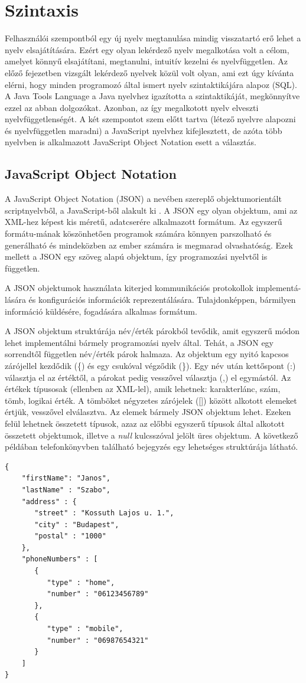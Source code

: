 \documentclass[a4paper,12pt]{report}
\begin{document}
\section{Szintaxis}
Felhasználói szempontból egy új nyelv megtanulása mindig visszatartó erő lehet a nyelv elsajátítására. Ezért egy olyan lekérdező nyelv megalkotása volt a célom, amelyet könnyű elsajátítani, megtanulni, intuitív kezelni és nyelvfüggetlen. Az előző fejezetben vizsgált lekérdező nyelvek közül volt olyan, ami ezt úgy kívánta elérni, hogy minden programozó által ismert nyelv szintaktikájára alapoz (SQL). A Java Tools Language a Java nyelvhez igazította a szintaktikáját, megkönnyítve ezzel az abban dolgozókat. Azonban, az így megalkotott nyelv elveszti nyelvfüggetlenségét. A két szempontot szem előtt tartva (létező nyelvre alapozni és nyelvfüggetlen maradni) a JavaScript nyelvhez kifejlesztett, de azóta több nyelvben is alkalmazott JavaScript Object Notation esett a választás.
\subsection{JavaScript Object Notation}
A JavaScript Object Notation (JSON) a nevében szereplő objektumorientált scriptnyelvből, a JavaScript-ből alakult ki \cite{json}. A JSON egy olyan objektum, ami az XML-hez képest kis méretű, adatcserére alkalmazott formátum. Az egyszerű formátu-mának köszönhetően programok számára könnyen parszolható és generálható és mindeközben az ember számára is megmarad olvashatóság. Ezek mellett a JSON egy szöveg alapú objektum, így programozási nyelvtől is független.
\par A JSON objektumok használata kiterjed kommunikációs protokollok implementá-lására és konfigurációs információk reprezentálására. Tulajdonképpen, bármilyen információ küldésére, fogadására alkalmas formátum.
\par A JSON objektum struktúrája név/érték párokból tevődik, amit egyszerű módon lehet implementálni bármely programozási nyelv által. Tehát, a JSON egy sorrendtől független név/érték párok halmaza. Az objektum egy nyitó kapcsos zárójellel kezdődik (\{) és egy csukóval végződik (\}). Egy név után kettőspont (:) választja el az értéktől, a párokat pedig vesszővel választja (,) el egymástól. Az értékek típusosak (ellenben az XML-lel), amik lehetnek: karakterlánc, szám, tömb, logikai érték. A tömböket négyzetes zárójelek ([]) között alkotott elemeket értjük, vesszővel elválasztva. Az elemek bármely JSON objektum lehet. Ezeken felül lehetnek összetett típusok, azaz az előbbi egyszerű típusok által alkotott összetett objektumok, illetve a \textit{null} kulcsszóval jelölt üres objektum. A következő példában telefonkönyvben található bejegyzés egy lehetséges struktúrája látható.
\begin{verbatim}
{
    "firstName": "Janos",
    "lastName" : "Szabo",
    "address" : {
       "street" : "Kossuth Lajos u. 1.",
       "city" : "Budapest",
       "postal" : "1000"
    },
    "phoneNumbers" : [
       {
          "type" : "home",
          "number" : "06123456789"
       },
       {
          "type" : "mobile",
          "number" : "06987654321"
       }
    ]
}
\end{verbatim}
\end{document}
